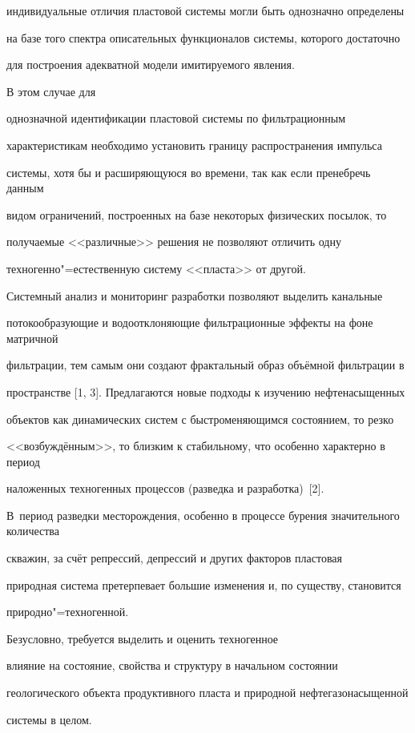 индивидуальные отличия пластовой системы могли быть однозначно определены

на базе того спектра описательных функционалов системы, которого достаточно

для построения адекватной модели имитируемого явления.

В этом случае для

однозначной идентификации пластовой системы по фильтрационным

характеристикам необходимо установить границу распространения импульса

системы, хотя бы и расширяющуюся во времени, так как если пренебречь данным

видом ограничений, построенных на базе некоторых физических посылок, то

получаемые <<различные>> решения не позволяют отличить одну

техногенно"=естественную систему <<пласта>> от другой.



Системный анализ и мониторинг разработки позволяют выделить канальные

потокообразующие и водоотклоняющие фильтрационные эффекты на фоне матричной

фильтрации, тем самым они создают фрактальный образ объёмной фильтрации в

пространстве [1, 3]. Предлагаются новые подходы к изучению нефтенасыщенных

объектов как динамических систем с быстроменяющимся состоянием, то резко

<<возбуждённым>>, то близким к стабильному, что особенно характерно в период

наложенных техногенных процессов (разведка и разработка)~[2].

В~период разведки месторождения, особенно в процессе бурения значительного количества

скважин, за счёт репрессий, депрессий и других факторов пластовая

природная система претерпевает большие изменения и, по существу, становится

природно"=техногенной.

Безусловно, требуется выделить и оценить техногенное

влияние на состояние, свойства и структуру в начальном состоянии

геологического объекта продуктивного пласта и природной нефтегазонасыщенной

системы в целом.



